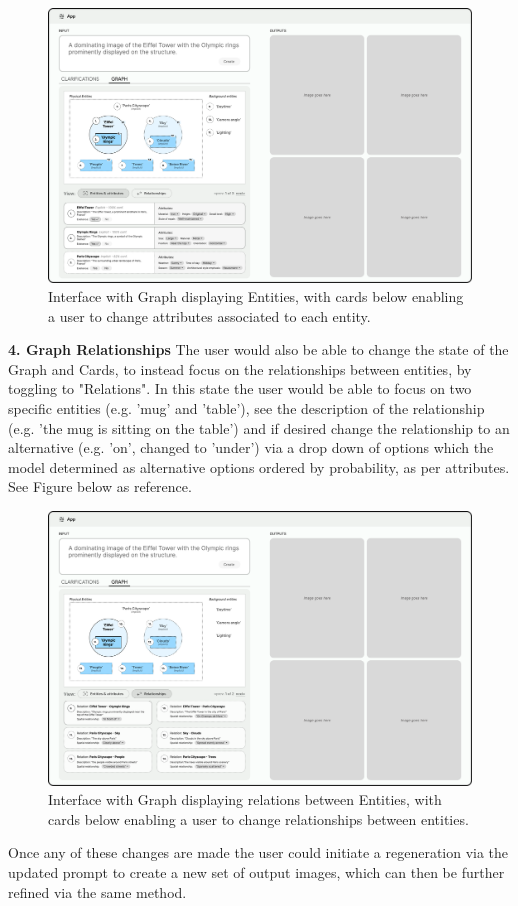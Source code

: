 \begin{figure} [ht!]
    \centering
    \includegraphics[width=.9\linewidth]{figures/Attributes.pdf}
    \caption{Interface with Graph displaying Entities, with cards below enabling a user to change attributes associated to each entity.}
    \label{fig:interface3}
\end{figure} 

\textbf{4. Graph Relationships} 
The user would also be able to change the state of the Graph and Cards, to instead focus on the relationships between entities, by toggling to "Relations". In this state the user would be able to focus on two specific entities (e.g. 'mug' and 'table'), see the description of the relationship (e.g. 'the mug is sitting on the table') and if desired change the relationship to an alternative (e.g. 'on', changed to 'under') via a drop down of options which the model determined as alternative options ordered by probability, as per attributes. See Figure  below as reference.

\begin{figure} [ht!]
    \centering
    \includegraphics[width=.9\linewidth]{figures/Relations.pdf}
    \caption{Interface with Graph displaying relations between Entities, with cards below enabling a user to change relationships between entities.}
    \label{fig:interface4}
\end{figure} 

Once any of these changes are made the user could initiate a regeneration via the updated prompt to create a new set of output images, which can then be further refined via the same method. 

